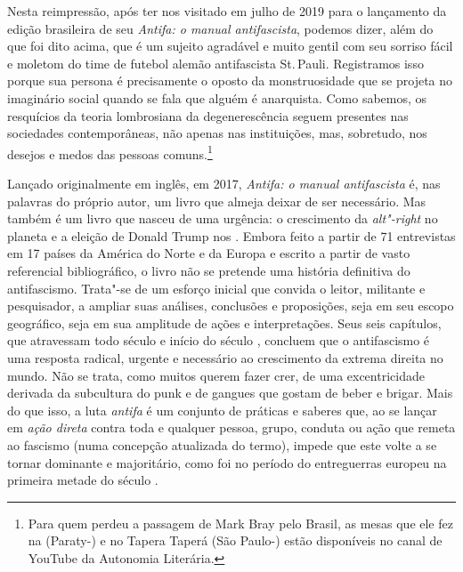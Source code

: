 Nesta reimpressão, após ter nos visitado em julho de 2019 para o
lançamento da edição brasileira de seu \emph{Antifa: o manual antifascista}, podemos
dizer, além do que foi dito acima, que é um sujeito agradável e muito
gentil com seu sorriso fácil e moletom do time de futebol alemão
antifascista St.\,Pauli. Registramos isso porque sua persona é
precisamente o oposto da monstruosidade que se projeta no imaginário
social quando se fala que alguém é anarquista. Como sabemos, os
resquícios da teoria lombrosiana da degenerescência seguem presentes nas
sociedades contemporâneas, não apenas nas instituições, mas, sobretudo,
nos desejos e medos das pessoas comuns.\footnote{Para quem perdeu a
  passagem de Mark Bray pelo Brasil, as mesas que ele fez na 
  (Paraty-) e no Tapera Taperá (São Paulo-) estão disponíveis no
  canal de YouTube da Autonomia Literária.} %

Lançado originalmente em inglês, em 2017, \emph{Antifa: o manual antifascista} é, nas palavras do próprio autor, um livro que almeja
deixar de ser necessário. Mas também é um livro que nasceu de uma
urgência: o crescimento da \emph{alt"-right} no planeta e a eleição de
Donald Trump nos . Embora feito a partir de 71 entrevistas em 17
países da América do Norte e da Europa e escrito a partir de vasto
referencial bibliográfico, o livro não se pretende uma história
definitiva do antifascismo. Trata"-se de um esforço inicial que convida o
leitor, militante e pesquisador, a ampliar suas análises, conclusões e
proposições, seja em seu escopo geográfico, seja em sua amplitude de
ações e interpretações. Seus seis capítulos, que atravessam todo século
 e início do século , concluem que o antifascismo é uma resposta
radical, urgente e necessário ao crescimento da extrema direita no
mundo. Não se trata, como muitos querem fazer crer, de uma
excentricidade derivada da subcultura do punk e de gangues que gostam de
beber e brigar. Mais do que isso, a luta \emph{antifa} é um conjunto de
práticas e saberes que, ao se lançar em \emph{ação direta} contra toda e
qualquer pessoa, grupo, conduta ou ação que remeta ao fascismo (numa
concepção atualizada do termo), impede que este volte a se tornar
dominante e majoritário, como foi no período do entreguerras europeu na
primeira metade do século .

